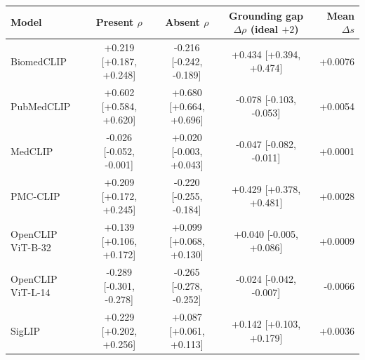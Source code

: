 \begin{tabular}{lcccr}
\toprule
Model & Present $\rho$ & Absent $\rho$ & Grounding gap $\Delta\rho$ (ideal $+2$) & Mean $\Delta s$ \\
\midrule
BiomedCLIP & +0.219 [+0.187, +0.248] & -0.216 [-0.242, -0.189] & +0.434 [+0.394, +0.474] & +0.0076 \\
PubMedCLIP & +0.602 [+0.584, +0.620] & +0.680 [+0.664, +0.696] & -0.078 [-0.103, -0.053] & +0.0054 \\
MedCLIP & -0.026 [-0.052, -0.001] & +0.020 [-0.003, +0.043] & -0.047 [-0.082, -0.011] & +0.0001 \\
PMC-CLIP & +0.209 [+0.172, +0.245] & -0.220 [-0.255, -0.184] & +0.429 [+0.378, +0.481] & +0.0028 \\
OpenCLIP ViT-B-32 & +0.139 [+0.106, +0.172] & +0.099 [+0.068, +0.130] & +0.040 [-0.005, +0.086] & +0.0009 \\
OpenCLIP ViT-L-14 & -0.289 [-0.301, -0.278] & -0.265 [-0.278, -0.252] & -0.024 [-0.042, -0.007] & -0.0066 \\
SigLIP & +0.229 [+0.202, +0.256] & +0.087 [+0.061, +0.113] & +0.142 [+0.103, +0.179] & +0.0036 \\
\bottomrule
\end{tabular}

